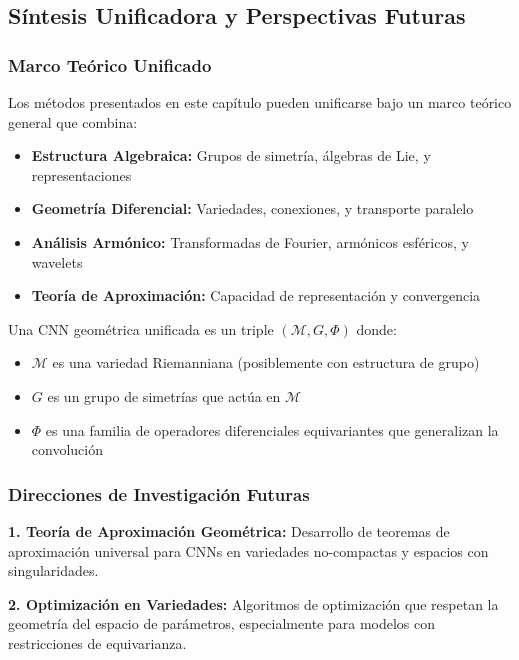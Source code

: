 \subsection{Síntesis Unificadora y Perspectivas Futuras}

\subsubsection{Marco Teórico Unificado}

Los métodos presentados en este capítulo pueden unificarse bajo un marco teórico general que combina:

\begin{itemize}
\item \textbf{Estructura Algebraica:} Grupos de simetría, álgebras de Lie, y representaciones
\item \textbf{Geometría Diferencial:} Variedades, conexiones, y transporte paralelo
\item \textbf{Análisis Armónico:} Transformadas de Fourier, armónicos esféricos, y wavelets
\item \textbf{Teoría de Aproximación:} Capacidad de representación y convergencia
\end{itemize}

\begin{definition}
Una CNN geométrica unificada es un triple $(\mathcal{M}, G, \Phi)$ donde:
\begin{itemize}
\item $\mathcal{M}$ es una variedad Riemanniana (posiblemente con estructura de grupo)
\item $G$ es un grupo de simetrías que actúa en $\mathcal{M}$
\item $\Phi$ es una familia de operadores diferenciales equivariantes que generalizan la convolución
\end{itemize}
\end{definition}

\subsubsection{Direcciones de Investigación Futuras}

\textbf{1. Teoría de Aproximación Geométrica:} Desarrollo de teoremas de aproximación universal para CNNs en variedades no-compactas y espacios con singularidades.

\textbf{2. Optimización en Variedades:} Algoritmos de optimización que respetan la geometría del espacio de parámetros, especialmente para modelos con restricciones de equivarianza.

